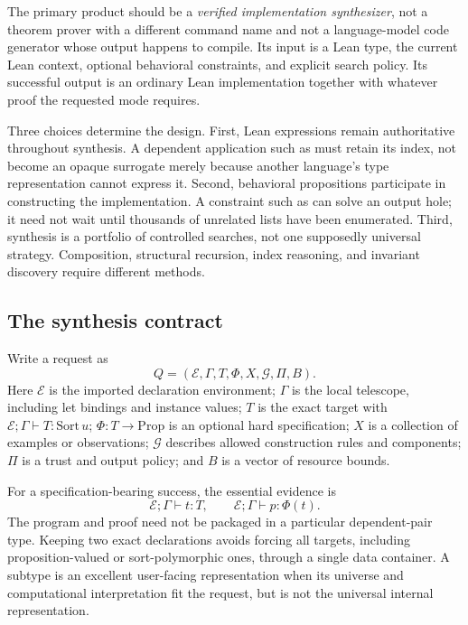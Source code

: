 \documentclass[11pt,letterpaper]{article}
\newcommand{\code}[1]{\texttt{\detokenize{#1}}}
\newcommand{\E}{\mathcal E}
\newcommand{\G}{\mathcal G}
\theoremstyle{definition}
\theoremstyle{remark}
\begin{document}
The primary product should be a \emph{verified implementation synthesizer}, not a theorem prover with a different command name and not a language-model code generator whose output happens to compile. Its input is a Lean type, the current Lean context, optional behavioral constraints, and explicit search policy. Its successful output is an ordinary Lean implementation together with whatever proof the requested mode requires.

Three choices determine the design. First, Lean expressions remain authoritative throughout synthesis. A dependent application such as \code{Vec alpha (n + 1)} must retain its index, not become an opaque surrogate merely because another language's type representation cannot express it. Second, behavioral propositions participate in constructing the implementation. A constraint such as \code{xs = [a]} can solve an output hole; it need not wait until thousands of unrelated lists have been enumerated. Third, synthesis is a portfolio of controlled searches, not one supposedly universal strategy. Composition, structural recursion, index reasoning, and invariant discovery require different methods.

\subsection{The synthesis contract}

Write a request as
\[
 Q=(\E,\Gamma,T,\Phi,X,\G,\Pi,B).
\]
Here $\E$ is the imported declaration environment; $\Gamma$ is the local telescope, including let bindings and instance values; $T$ is the exact target with $\E;\Gamma\vdash T:\mathrm{Sort}\,u$; $\Phi:T\to\mathrm{Prop}$ is an optional hard specification; $X$ is a collection of examples or observations; $\G$ describes allowed construction rules and components; $\Pi$ is a trust and output policy; and $B$ is a vector of resource bounds.

For a specification-bearing success, the essential evidence is
\begin{equation}
 \E;\Gamma\vdash t:T,
 \qquad
 \E;\Gamma\vdash p:\Phi(t).
 \label{eq:success}
\end{equation}
The program and proof need not be packaged in a particular dependent-pair type. Keeping two exact declarations avoids forcing all targets, including proposition-valued or sort-polymorphic ones, through a single data container. A subtype is an excellent user-facing representation when its universe and computational interpretation fit the request, but is not the universal internal representation.
\end{document}
